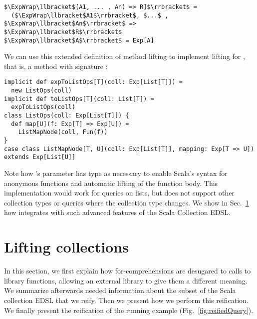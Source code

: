 \begin{lstlisting}
$\ExpWrap\llbracket$(A1, ... , An) => R]$\rrbracket$ =
  ($\ExpWrap\llbracket$A1$\rrbracket$, $...$ , $\ExpWrap\llbracket$An$\rrbracket$ => $\ExpWrap\llbracket$R$\rrbracket$
$\ExpWrap\llbracket$A$\rrbracket$ = Exp[A]
\end{lstlisting}

We can use this extended definition of method lifting to  implement  lifting for , that is, a method with signature :

\begin{lstlisting}
implicit def expToListOps[T](coll: Exp[List[T]]) = 
  new ListOps(coll)
implicit def toListOps[T](coll: List[T]) = 
  expToListOps(coll)
class ListOps(coll: Exp[List[T]]) {
  def map[U](f: Exp[T] => Exp[U]) =
    ListMapNode(coll, Fun(f))
}
case class ListMapNode[T, U](coll: Exp[List[T]], mapping: Exp[T => U]) extends Exp[List[U]]
\end{lstlisting}

Note how 's parameter  has type  as necessary to enable Scala's syntax for anonymous functions and automatic lifting of the function body. This implementation would work for queries on lists, but does not support other collection types or queries where the collection type changes. We show in Sec.~\ref{subsec:collections} how {\LoS} integrates with such advanced features of the Scala Collection EDSL.


\section{Lifting collections}
\label{subsec:collections}
In this section, we first explain how for-comprehensions are desugared to calls to library functions, allowing an external library to give them a different meaning. We summarize afterwards needed information about the subset of the Scala collection EDSL that we reify. Then we present how we perform this reification.
We finally present the reification of the running example (Fig.~\ref{fig:reifiedQuery}).


